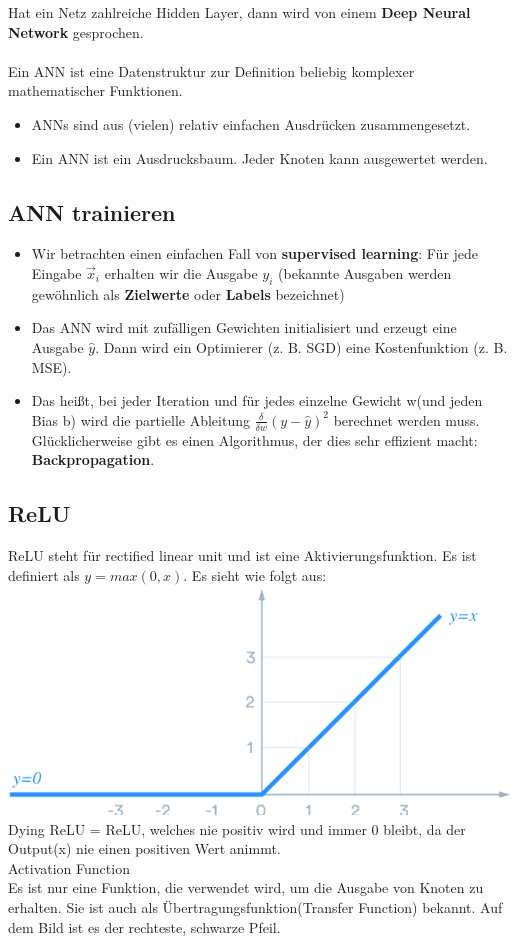 Hat ein Netz zahlreiche Hidden Layer, dann wird von einem \textbf{Deep Neural Network} gesprochen.\\
\\
Ein ANN ist eine Datenstruktur zur Definition beliebig komplexer mathematischer Funktionen.
\begin{itemize}
\item ANNs sind aus (vielen) relativ einfachen Ausdrücken zusammengesetzt.
\item Ein ANN ist ein Ausdrucksbaum. Jeder Knoten kann ausgewertet werden.
\end{itemize}

\subsection{ANN trainieren}
\begin{itemize}
\item Wir betrachten einen einfachen Fall von \textbf{supervised learning}: Für jede Eingabe $\vec{x}_i$ erhalten wir die Ausgabe $y_i$ (bekannte Ausgaben werden gewöhnlich als \textbf{Zielwerte} oder \textbf{Labels} bezeichnet)
\item Das ANN wird mit zufälligen Gewichten initialisiert und erzeugt eine Ausgabe $\hat y$. Dann wird ein Optimierer (z. B. SGD) eine Kostenfunktion (z. B. MSE).
\item Das heißt, bei jeder Iteration und für jedes einzelne Gewicht w(und jeden Bias b) wird die partielle Ableitung $\frac{\delta}{\delta w}(y- \hat y)^2$ berechnet werden muss. Glücklicherweise gibt es einen Algorithmus, der dies sehr effizient macht: \textbf{Backpropagation}.
\end{itemize}
\subsection{ReLU}
ReLU steht für rectified linear unit und ist eine Aktivierungsfunktion. Es ist definiert als $y = max(0, x)$. Es sieht wie folgt aus:
\includegraphics[width=\linewidth]{img/relu.png}
Dying ReLU = ReLU, welches nie positiv wird und immer 0 bleibt, da der Output(x) nie einen positiven Wert animmt.\\
\textcolor{myblue}{Activation Function}\\
Es ist nur eine Funktion, die verwendet wird, um die Ausgabe von Knoten zu erhalten. Sie ist auch als Übertragungsfunktion(Transfer Function) bekannt. Auf dem Bild ist es der rechteste, schwarze Pfeil.